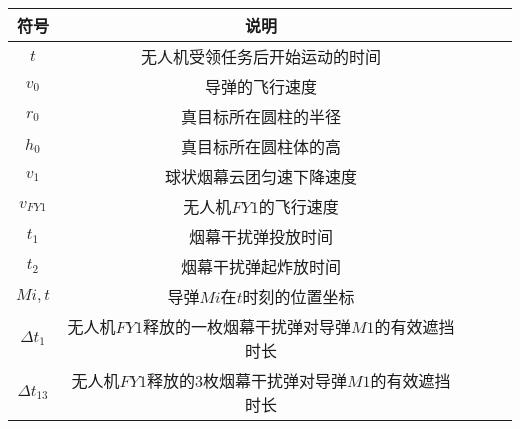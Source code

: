 \documentclass[../main.tex]{subfiles}
\begin{document}




\begin{table}[H]
\centering
\tabcolsep=2cm%
\begin{tabular}{ccccc}
\toprule[1.5pt]
符号 & 说明  \\ 
\midrule[1pt]
$t$              & 无人机受领任务后开始运动的时间            \\
$ v_0 $          & 导弹的飞行速度                          \\
$r_0$            &真目标所在圆柱的半径                      \\
$h_0$            &真目标所在圆柱体的高                      \\
$v_1$            &球状烟幕云团匀速下降速度                   \\
$v_{FY1}$        &无人机\( FY1 \)的飞行速度                 \\
$t_1$            &烟幕干扰弹投放时间                        \\
$t_2$            &烟幕干扰弹起炸放时间                      \\
$Mi,t$           &导弹$Mi$在$t$时刻的位置坐标               \\
$\varDelta t_1$  &无人机\( FY1 \)释放的一枚烟幕干扰弹对导弹$M1$的有效遮挡时长             \\
$\Delta t_{13}$  &无人机\( FY1 \)释放的3枚烟幕干扰弹对导弹$M1$的有效遮挡时长             \\







\bottomrule[1.5pt]
\end{tabular}
\end{table}
\end{document}
